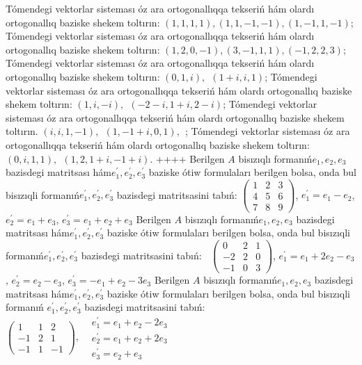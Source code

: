 Tómendegi vektorlar sisteması óz ara ortogonallıqqa tekseriń hám olardı ortogonallıq baziske shekem toltırın: \((1,1,1,1),(1,1, - 1, - 1),(1, - 1,1, - 1)\);
Tómendegi vektorlar sisteması óz ara ortogonallıqqa tekseriń hám olardı ortogonallıq baziske shekem toltırın: \((1,2,0, - 1),(3, - 1,1,1),( - 1,2,2,3)\);
Tómendegi vektorlar sisteması óz ara ortogonallıqqa tekseriń hám olardı ortogonallıq baziske shekem toltırın: \((0,1,i),\ \ (1 + i,i,1)\);
Tómendegi vektorlar sisteması óz ara ortogonallıqqa tekseriń hám olardı ortogonallıq baziske shekem toltırın: \((1,i, - i),\ \ ( - 2 - i,1 + i,2 - i)\);
Tómendegi vektorlar sisteması óz ara ortogonallıqqa tekseriń hám olardı ortogonallıq baziske shekem toltırın. \((i,i,1, - 1),\ \ (1, - 1 + i,0,1),\ \ \);
Tómendegi vektorlar sisteması óz ara ortogonallıqqa tekseriń hám olardı ortogonallıq baziske shekem toltırın: \((0,i,1,1),\ \ (1,2,1 + i, - 1 + i)\).
++++
Berilgen \(A\) bisızıqlı formanıń\(e_{1},e_{2},e_{3}\) bazisdegi matritsası hám\(e_{1}^{'},e_{2}^{'},e_{3}^{'}\) baziske ótiw formulaları berilgen bolsa, onda bul bisızıqli formanıń\(e_{1}^{'},e_{2}^{'},e_{3}^{'}\) bazisdegi matritsasini tabıń: \(\begin{pmatrix} 1 & 2 & 3 \\ 4 & 5 & 6 \\ 7 & 8 & 9 \end{pmatrix}\), \(e_{1}^{'} = e_{1} - e_{2}\), \(e_{2}^{'} = e_{1} + e_{3}\), \(e_{3}^{'} = e_{1} + e_{2} + e_{3}\)
Berilgen \(A\) bisızıqlı formanıń\(e_{1},e_{2},e_{3}\) bazisdegi matritsası hám\(e_{1}^{'},e_{2}^{'},e_{3}^{'}\) baziske ótiw formulaları berilgen bolsa, onda bul bisızıqli formanıń\(e_{1}^{'},e_{2}^{'},e_{3}^{'}\) bazisdegi matritsasini tabıń: \(\ \) \(\begin{pmatrix} 0 & 2 & 1 \\  - 2 & 2 & 0 \\  - 1 & 0 & 3 \end{pmatrix}\), \(e_{1}^{'} = e_{1} + 2e_{2} - e_{3}\), \(e_{2}^{'} = e_{2} - e_{3}\), \(e_{3}^{'} = - e_{1} + e_{2} - 3e_{3}\)
Berilgen \(A\) bisızıqlı formanıń\(e_{1},e_{2},e_{3}\) bazisdegi matritsası hám\(e_{1}^{'},e_{2}^{'},e_{3}^{'}\) baziske ótiw formulaları berilgen bolsa, onda bul bisızıqli formanıń \(e_{1}^{'},e_{2}^{'},e_{3}^{'}\) bazisdegi matritsasini tabıń: \(\begin{pmatrix} 1 & 1 & 2 \\  - 1 & 2 & 1 \\  - 1 & 1 & - 1 \end{pmatrix},\begin{matrix}  & e_{1}^{'} = e_{1} + e_{2} - 2e_{3} \\  & e_{2}^{'} = e_{1} + e_{2} + 2e_{3} \\  & e_{3}^{'} = e_{2} + e_{3} \end{matrix}\)
